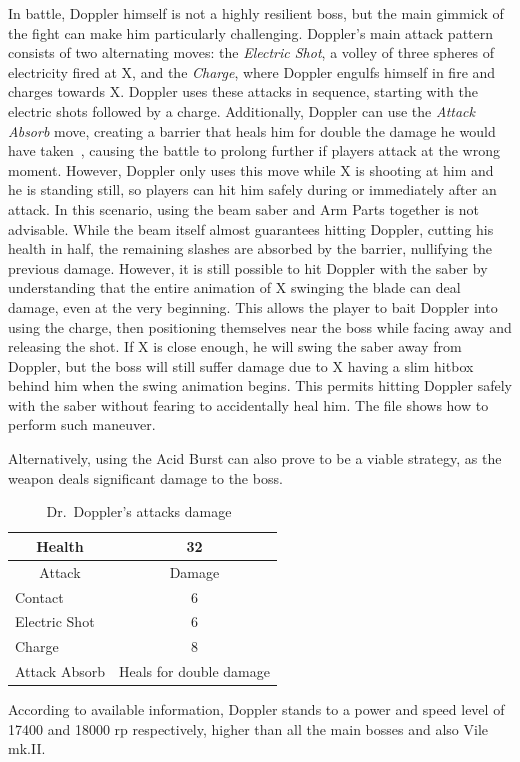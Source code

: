 In battle, Doppler himself is not a highly resilient boss, but the main gimmick of the fight can make him particularly challenging. Doppler's main attack pattern consists of two alternating moves: the \emph{Electric Shot}, a volley of three spheres of electricity fired at X, and the \emph{Charge}, where Doppler engulfs himself in fire and charges towards X. Doppler uses these attacks in sequence, starting with the electric shots followed by a charge. Additionally, Doppler can use the \emph{Attack Absorb} move, creating a barrier that heals him for double the damage he would have taken~\cite{wiki:X3_enemies}, causing the battle to prolong further if players attack at the wrong moment. However, Doppler only uses this move while X is shooting at him and he is standing still, so players can hit him safely during or immediately after an attack. In this scenario, using the beam saber and Arm Parts together is not advisable. While the beam itself almost guarantees hitting Doppler, cutting his health in half, the remaining slashes are absorbed by the barrier, nullifying the previous damage. However, it is still possible to hit Doppler with the saber by understanding that the entire animation of X swinging the blade can deal damage, even at the very beginning. This allows the player to bait Doppler into using the charge, then positioning themselves near the boss while facing away and releasing the shot. If X is close enough, he will swing the saber away from Doppler, but the boss will still suffer damage due to X having a slim hitbox behind him when the swing animation begins. This permits hitting Doppler safely with the saber without fearing to accidentally heal him. The file  shows how to perform such maneuver.

 Alternatively, using the Acid Burst can also prove to be a viable strategy, as the weapon deals significant damage to the boss.
\begin{table}[htp]
	\centering
	\begin{tabular}[h]{l c}
		\toprule
		\multicolumn{1}{c}{Health}  & 32 \\
		\midrule
		\multicolumn{1}{c}{Attack} & \multicolumn{1}{c}{Damage}\\
		Contact & 6 \\
		Electric Shot & 6\\
		Charge & 8\\
		Attack Absorb & Heals for double damage\\
		\bottomrule
	\end{tabular}
	\caption{Dr.~Doppler's attacks damage~\cite{wiki:Doppler,book:Compendium}}
\end{table}
According to available information, Doppler stands to a power and speed level of 17400 and 18000 rp respectively, higher than all the main bosses and also Vile mk.II.


